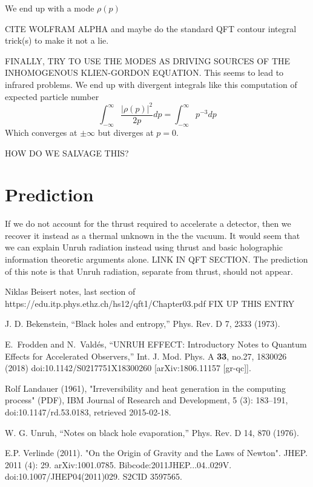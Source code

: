 \documentclass[12pt,a4paper]{article}
\begin{document}
We end up with a mode $\rho(p)$

CITE WOLFRAM ALPHA and maybe do the standard QFT contour integral trick(s) to make it not a lie.

FINALLY, TRY TO USE THE MODES AS DRIVING SOURCES OF THE INHOMOGENOUS KLIEN-GORDON EQUATION.  This seems to lead to infrared problems.  We end up with divergent integrals like this computation of expected particle number \cite{Frodden}
\[
 \int_{-\infty}^\infty \frac {|\rho(p)|^2}{2p} dp = \int_{-\infty}^\infty p^{-3} dp
\]
Which converges at $\pm \infty$ but diverges at $p=0$.

 
HOW DO WE SALVAGE THIS?


\section{Prediction}
If we do not account for the thrust required to accelerate a detector, then we recover it instead as a thermal unknown in the the vacuum.  It would seem that we can explain Unruh radiation instead using thrust and basic holographic information theoretic arguments alone.  LINK IN QFT SECTION. The prediction of this note is that Unruh radiation, separate from thrust, should not appear.

\begin{thebibliography}{2}

Niklas Beisert notes, last section of 
https://edu.itp.phys.ethz.ch/hs12/qft1/Chapter03.pdf
FIX UP THIS ENTRY

 J. D. Bekenstein, “Black holes and entropy,” Phys. Rev. D 7, 2333 (1973).

E.~Frodden and N.~Vald\'es,
``UNRUH EFFECT: Introductory Notes to Quantum Effects for Accelerated Observers,''
Int. J. Mod. Phys. A \textbf{33}, no.27, 1830026 (2018)
doi:10.1142/S0217751X18300260
[arXiv:1806.11157 [gr-qc]].
  
Rolf Landauer (1961), "Irreversibility and heat generation in the computing process" (PDF), IBM Journal of Research and Development, 5 (3): 183–191, doi:10.1147/rd.53.0183, retrieved 2015-02-18.

W. G. Unruh, “Notes on black hole evaporation,” Phys. Rev. D 14, 870 (1976).

E.P. Verlinde (2011). "On the Origin of Gravity and the Laws of Newton". JHEP. 2011 (4): 29. arXiv:1001.0785. Bibcode:2011JHEP...04..029V. doi:10.1007/JHEP04(2011)029. S2CID 3597565.
\end{thebibliography}
\end{document}
